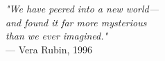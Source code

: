 \begin{flushright}
\emph{"We have peered into a new world—\\
and found it far more mysterious\\
than we ever imagined."}\\
— Vera Rubin, 1996
\end{flushright}
